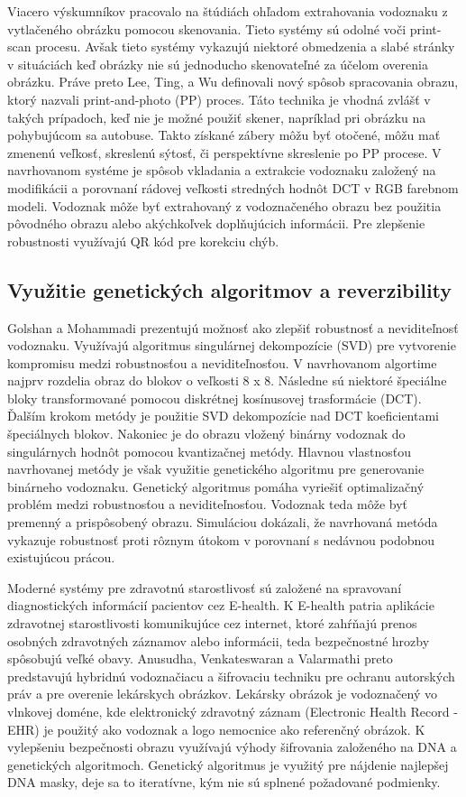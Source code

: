 Viacero výskumníkov pracovalo na štúdiách ohľadom extrahovania vodoznaku z vytlačeného obrázku pomocou skenovania. Tieto systémy sú odolné voči print-scan procesu. Avšak tieto systémy vykazujú niektoré obmedzenia a slabé stránky v situáciách keď obrázky nie sú jednoducho skenovateľné za účelom overenia obrázku. Práve preto Lee, Ting, a Wu \cite{Lee2016} definovali nový spôsob spracovania obrazu, ktorý nazvali print-and-photo (PP) proces. Táto technika je vhodná zvlášť v takých prípadoch, keď nie je možné použiť skener, napríklad pri obrázku na pohybujúcom sa autobuse. Takto získané zábery môžu byť otočené, môžu mať zmenenú veľkosť, skreslenú sýtosť, či perspektívne skreslenie po PP procese. V navrhovanom systéme je spôsob vkladania a extrakcie vodoznaku založený na modifikácii a porovnaní rádovej veľkosti stredných hodnôt DCT v RGB farebnom modeli. Vodoznak môže byť extrahovaný z vodoznačeného obrazu bez použitia pôvodného obrazu alebo akýchkoľvek doplňujúcich informácii. Pre zlepšenie robustnosti využívajú QR kód pre korekciu chýb.

\subsection{Využitie genetických algoritmov a reverzibility}
Golshan a Mohammadi \cite{Golshan} prezentujú možnosť ako zlepšiť robustnosť a neviditeľnosť vodoznaku. Využívajú algoritmus singulárnej dekompozície (SVD) pre vytvorenie kompromisu medzi robustnosťou a neviditeľnosťou. V navrhovanom algortime najprv rozdelia obraz do blokov o veľkosti 8 x 8. Následne sú niektoré špeciálne bloky transformované pomocou diskrétnej kosínusovej trasformácie (DCT). Ďalším krokom metódy je použitie SVD dekompozície nad DCT koeficientami špeciálnych blokov. Nakoniec je do obrazu vložený binárny vodoznak do singulárnych hodnôt pomocou kvantizačnej metódy. Hlavnou vlastnosťou navrhovanej metódy je však využitie genetického algoritmu pre generovanie binárneho vodoznaku. Genetický algoritmus pomáha vyriešiť optimalizačný problém medzi robustnosťou a neviditeľnosťou. Vodoznak teda môže byť premenný a prispôsobený obrazu. Simuláciou dokázali, že navrhovaná metóda vykazuje robustnosť proti rôznym útokom v porovnaní s nedávnou podobnou existujúcou prácou.

Moderné systémy pre zdravotnú starostlivosť sú založené na spravovaní diagnostických informácií pacientov cez E-health. K E-health patria aplikácie zdravotnej starostlivosti komunikujúce cez internet, ktoré zahŕňajú prenos osobných zdravotných záznamov alebo informácii, teda bezpečnostné hrozby spôsobujú veľké obavy. Anusudha, Venkateswaran a Valarmathi \cite{Anusudha2017} preto predstavujú hybridnú vodoznačiacu a šifrovaciu techniku pre ochranu autorských práv a pre overenie lekárskych obrázkov. Lekársky obrázok je vodoznačený vo vlnkovej doméne, kde elektronický zdravotný záznam (Electronic Health Record - EHR) je použitý ako vodoznak a logo nemocnice ako referenčný obrázok. K vylepšeniu bezpečnosti obrazu využívajú výhody šifrovania založeného na DNA a genetických algoritmoch. Genetický algoritmus je využitý pre nájdenie najlepšej DNA masky, deje sa to iteratívne, kým nie sú splnené požadované podmienky.

